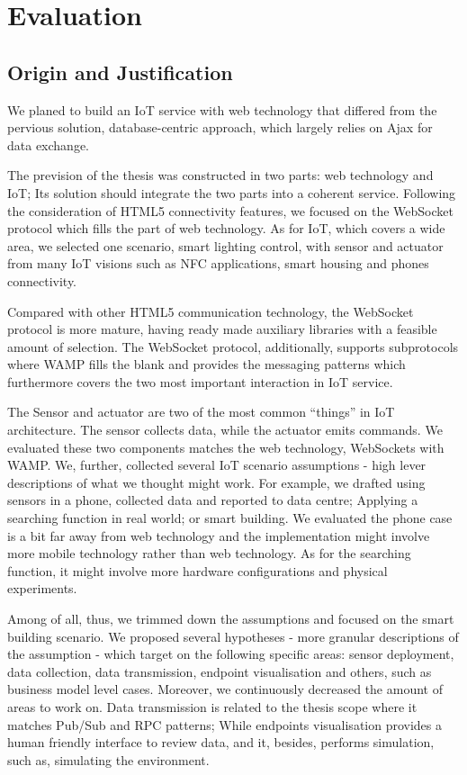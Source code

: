 \chapter{Evaluation}
\label{chapter:evaluation}

\section{Origin and Justification}
We planed to build an IoT service with web technology that differed from the pervious solution, database-centric approach, which largely relies on Ajax for data exchange. 

The prevision of the thesis was constructed in two parts: web technology and IoT; Its solution should integrate the two parts into a coherent service. Following the consideration of HTML5 connectivity features, we focused on the WebSocket protocol which fills the part of web technology. As for IoT, which covers a wide area, we selected one scenario, smart lighting control, with sensor and actuator from many IoT visions such as NFC applications, smart housing and phones connectivity. 

Compared with other HTML5 communication technology, the WebSocket protocol is more mature, having ready made auxiliary libraries with a feasible amount of selection. The WebSocket protocol, additionally, supports subprotocols where WAMP fills the blank and provides the messaging patterns which furthermore covers the two most important interaction in IoT service.

The Sensor and actuator are two of the most common ``things'' in IoT architecture. The sensor collects data, while the actuator emits commands. We evaluated these two components matches the web technology, WebSockets with WAMP. We, further, collected several IoT scenario assumptions - high lever descriptions of what we thought might work. For example, we drafted using sensors in a phone, collected data and reported to data centre; Applying a searching function in real world; or smart building. We evaluated the phone case is a bit far away from web technology and the implementation might involve more mobile technology rather than web technology. As for the searching function, it might involve more hardware configurations and physical experiments. 

Among of all, thus, we trimmed down the assumptions and focused on the smart building scenario. We proposed several hypotheses - more granular descriptions of the assumption - which target on the following specific areas: sensor deployment, data collection, data transmission, endpoint visualisation and others, such as business model level cases. Moreover, we continuously decreased the amount of areas to work on. Data transmission is related to the thesis scope where it matches Pub/Sub and RPC patterns; While endpoints visualisation provides a human friendly interface to review data, and it, besides, performs simulation, such as, simulating the environment.

